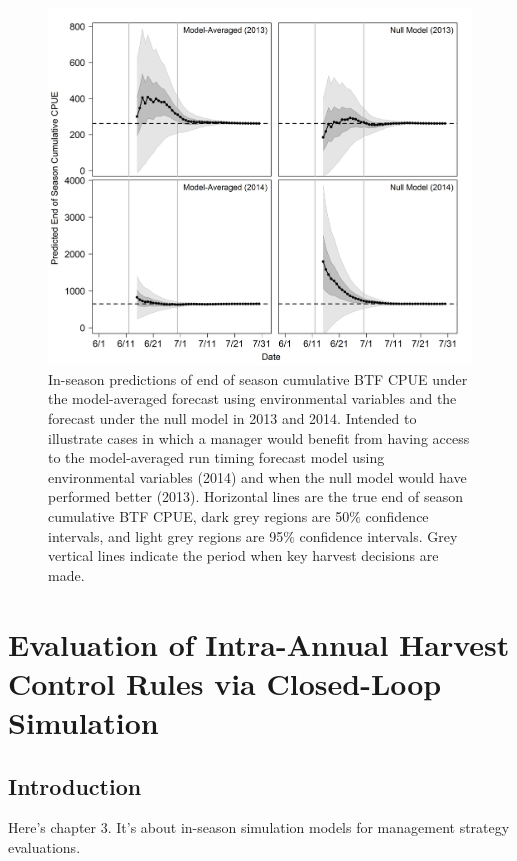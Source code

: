 \documentclass[12pt,]{book}
\theoremstyle{definition}
\theoremstyle{definition}
\theoremstyle{definition}
\theoremstyle{remark}
\begin{document}
\begin{figure}
  \centering
  \includegraphics{img/Ch2/eos-preds.png}
  \caption{In-season predictions of end of season cumulative BTF CPUE under the model-averaged forecast using environmental variables and the forecast under the null model in 2013 and 2014. Intended to illustrate cases in which a manager would benefit from having access to the model-averaged run timing forecast model using environmental variables (2014) and when the null model would have performed better (2013). Horizontal lines are the true end of season cumulative BTF CPUE, dark grey regions are 50$\%$ confidence intervals, and light grey regions are 95$\%$ confidence intervals. Grey vertical lines indicate the period when key harvest decisions are made.}
  \label{fig:eos-preds}
\end{figure}

\chapter{Evaluation of Intra-Annual Harvest Control Rules via
Closed-Loop Simulation}\label{ch3}

\section{Introduction}\label{introduction-1}

Here's chapter 3. It's about in-season simulation models for management
strategy evaluations.
\end{document}
